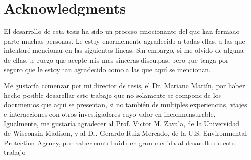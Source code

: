 



\bigskip

\begingroup
\let\clearpage\relax
\let\cleardoublepage\relax
\let\cleardoublepage\relax
\chapter*{Acknowledgments}
El desarrollo de esta tesis ha sido un proceso emocionante del que han formado parte muchas personas. Le estoy enormemente agradecido a todas ellas, a las que intentaré mencionar en las siguientes lineas. Sin embargo, si me olvido de alguna de ellas, le ruego que acepte mis mas sinceras disculpas, pero que tenga por seguro que le estoy tan agradecido como a las que aquí se mencionan.

Me gustaría comenzar por mi director de tesis, el Dr. Mariano Martín, por haber hecho posible desarollar este trabajo que no solamente se compone de los documentos que aqui se presentan, si no también de multiples experiencias, viajes e interacciones con otros investigadores cuyo valor en inconmensurable. Igualmente, me gustaría agradecer al Prof. Victor M. Zavala, de la Universidad de Wisconsin-Madison, y al Dr. Gerardo Ruiz Mercado, de la U.S. Environmental Protection Agency, por haber contribuido en gran medida al desarollo de este trabajo


\endgroup
